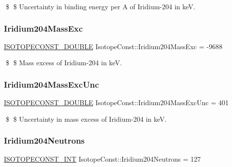 \$ \$ Uncertainty in binding energy per A of Iridium-\/204 in keV. \mbox{\label{group___isotope_const-_iridium-_ir204_gaeb71a63f7496fec7d178ba80c3656e95}} 
\subsubsection{\texorpdfstring{Iridium204\+Mass\+Exc}{Iridium204MassExc}}
{\footnotesize\ttfamily \mbox{\hyperlink{group___isotope_const-_macros_ga8f45a7272ce02c0b4c65c44636ed719a}{I\+S\+O\+T\+O\+P\+E\+C\+O\+N\+S\+T\+\_\+\+D\+O\+U\+B\+LE}} Isotope\+Const\+::\+Iridium204\+Mass\+Exc = -\/9688}

\$ \$ Mass excess of Iridium-\/204 in keV. \mbox{\label{group___isotope_const-_iridium-_ir204_ga6220ccc3c95eab9268c78bb33f30efcf}} 
\subsubsection{\texorpdfstring{Iridium204\+Mass\+Exc\+Unc}{Iridium204MassExcUnc}}
{\footnotesize\ttfamily \mbox{\hyperlink{group___isotope_const-_macros_ga8f45a7272ce02c0b4c65c44636ed719a}{I\+S\+O\+T\+O\+P\+E\+C\+O\+N\+S\+T\+\_\+\+D\+O\+U\+B\+LE}} Isotope\+Const\+::\+Iridium204\+Mass\+Exc\+Unc = 401}

\$ \$ Uncertainty in mass excess of Iridium-\/204 in keV. \mbox{\label{group___isotope_const-_iridium-_ir204_gaae76473cf9e6d713b1d5dd751a66bcac}} 
\subsubsection{\texorpdfstring{Iridium204\+Neutrons}{Iridium204Neutrons}}
{\footnotesize\ttfamily \mbox{\hyperlink{group___isotope_const-_macros_ga5f18360b3e99483a35c32d789e62621c}{I\+S\+O\+T\+O\+P\+E\+C\+O\+N\+S\+T\+\_\+\+I\+NT}} Isotope\+Const\+::\+Iridium204\+Neutrons = 127}

